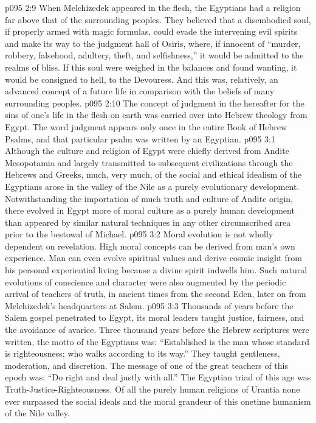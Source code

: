 \vs p095 2:9 When Melchizedek appeared in the flesh, the Egyptians had a religion far above that of the surrounding peoples. They believed that a disembodied soul, if properly armed with magic formulas, could evade the intervening evil spirits and make its way to the judgment hall of Osiris, where, if innocent of “murder, robbery, falsehood, adultery, theft, and selfishness,” it would be admitted to the realms of bliss. If this soul were weighed in the balances and found wanting, it would be consigned to hell, to the Devouress. And this was, relatively, an advanced concept of a future life in comparison with the beliefs of many surrounding peoples.
\vs p095 2:10 The concept of judgment in the hereafter for the sins of one’s life in the flesh on earth was carried over into Hebrew theology from Egypt. The word judgment appears only once in the entire Book of Hebrew Psalms, and that particular psalm was written by an Egyptian.
\vs p095 3:1 Although the culture and religion of Egypt were chiefly derived from Andite Mesopotamia and largely transmitted to subsequent civilizations through the Hebrews and Greeks, much, very much, of the social and ethical idealism of the Egyptians arose in the valley of the Nile as a purely evolutionary development. Notwithstanding the importation of much truth and culture of Andite origin, there evolved in Egypt more of moral culture as a purely human development than appeared by similar natural techniques in any other circumscribed area prior to the bestowal of Michael.
\vs p095 3:2 Moral evolution is not wholly dependent on revelation. High moral concepts can be derived from man’s own experience. Man can even evolve spiritual values and derive cosmic insight from his personal experiential living because a divine spirit indwells him. Such natural evolutions of conscience and character were also augmented by the periodic arrival of teachers of truth, in ancient times from the second Eden, later on from Melchizedek’s headquarters at Salem.
\vs p095 3:3 Thousands of years before the Salem gospel penetrated to Egypt, its moral leaders taught justice, fairness, and the avoidance of avarice. Three thousand years before the Hebrew scriptures were written, the motto of the Egyptians was: “Established is the man whose standard is righteousness; who walks according to its way.” They taught gentleness, moderation, and discretion. The message of one of the great teachers of this epoch was: “Do right and deal justly with all.” The Egyptian triad of this age was Truth\hyp{}Justice\hyp{}Righteousness. Of all the purely human religions of Urantia none ever surpassed the social ideals and the moral grandeur of this onetime humanism of the Nile valley.
